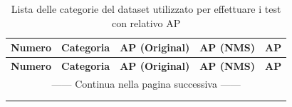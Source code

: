 \newpage
\begin{center}
\begin{longtable}{|c|l|c|c|c|}

\hline \multicolumn{1}{|c|}{\textbf{Numero}} &
\multicolumn{1}{c|}{\textbf{Categoria}} & \multicolumn{1}{c|}{\textbf{AP (Original)}} &\multicolumn{1}{c|}{\textbf{AP (NMS)}} &\multicolumn{1}{c|}{\textbf{AP}} \\ \hline\endfirsthead

\hline \multicolumn{1}{|c|}{\textbf{Numero}} &
\multicolumn{1}{c|}{\textbf{Categoria}} &\multicolumn{1}{c|}{\textbf{AP (Original)}} &\multicolumn{1}{c|}{\textbf{AP (NMS)}} &\multicolumn{1}{c|}{\textbf{AP}}\\ \hline \endhead

\hline \multicolumn{5}{|c|}{{------ Continua nella pagina successiva ------}} \\ \hline
\endfoot

\hline

\caption{Lista delle categorie del dataset utilizzato per effettuare i test con relativo AP}
\label{lista categorie} \\

\endlastfoot



\end{longtable}
\end{center}
